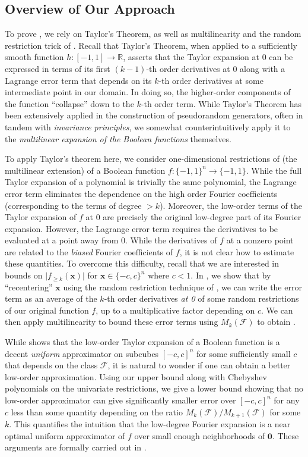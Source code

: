 \documentclass[10pt,a4paper]{article}
\theoremstyle{definition}
\begin{document}
\subsection{Overview of Our Approach}
{To prove , we rely on Taylor's Theorem, as well as multilinearity and the random restriction trick of \cite{CHHL}. Recall that Taylor's Theorem, when applied to a sufficiently smooth function $h\colon[-1,1]\to \mathbb{R}$, asserts that the Taylor expansion at $0$ can be expressed in terms of its first $(k-1)$-th order derivatives at $0$ along with a Lagrange error term that depends on its $k$-th order derivatives at some intermediate point in our domain.  In doing so, the higher-order components of the function ``collapse'' down to the $k$-th order term.  While Taylor's Theorem has been extensively applied in the construction of pseudorandom generators, often in tandem with \emph{invariance principles}, we somewhat counterintuitively apply it to the \emph{multilinear expansion of the Boolean functions} themselves.} 

{To apply Taylor's theorem here, we consider one-dimensional restrictions of (the multilinear extension) of a Boolean function $f\colon\{-1,1\}^n \to \{-1,1\}$. While the full Taylor expansion of a polynomial is trivially the same polynomial, the Lagrange error term  eliminates the dependence on the high order Fourier coefficients (corresponding to the terms of degree $>k$). Moreover, the low-order terms of the  Taylor expansion of $f$ at $0$
are precisely the original low-degree part of its Fourier expansion.  However, the Lagrange error term requires the derivatives to be evaluated at a point away from $0$.
While the derivatives of $f$ at a nonzero point are related to the \emph{biased} Fourier coefficients of $f$, it is not clear how to estimate these quantities.
To overcome this difficulty, recall that we are interested in bounds on $\vert f_{\geq k}(\mathbf{x})\vert$ for $\mathbf{x}\in \{-c,c\}^n$ where $c<1$.  In , we show that by ``recentering'' $\mathbf{x}$ using the random restriction technique of \cite{CHHL}, we can write the error term as an average of the $k$-th order derivatives \emph{at 0} of some random restrictions of our original function $f$, up to a multiplicative factor depending on $c$.  We can then apply multilinearity to bound these error terms using $M_k(\mathcal{F})$ to obtain .}

{While  shows that the low-order Taylor expansion of a Boolean function is a decent \emph{uniform} approximator on subcubes $[-c,c]^n$ for some sufficiently small $c$ that depends on the class $\mathcal{F}$, it is natural to wonder if one can obtain a better 
low-order approximation.  Using our upper bound along with Chebyshev polynomials on the univariate restrictions, we give a lower bound
showing that no low-order approximator can give significantly smaller error over $[-c,c]^n$ for any $c$ less than some quantity depending on the ratio $M_k(\mathcal{F})/M_{k+1}(\mathcal{F})$ for some $k$. This quantifies the intuition that the low-degree Fourier expansion is a near optimal uniform approximator of $f$ over small enough neighborhoods of $\mathbf{0}$. These arguments are formally carried out in .}
\end{document}
